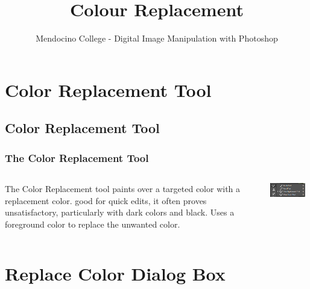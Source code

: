 \documentclass{beamer}
\title{Colour Replacement}
\author{Mendocino College - Digital Image Manipulation with Photoshop}
\date{\vspace{-5em}}
\begin{document}
	{
		\begin{frame}
			\vspace{-35pt}
			\maketitle
		\end{frame}
	}

		\section{Color Replacement Tool}
			\subsection{Color Replacement Tool}		
			\begin{frame}
				\frametitle{The Color Replacement Tool}
				\begin{columns}
					\column{.6\textwidth}
					\vspace{-25pt}
					\begin{outline}
						\1 The Color Replacement tool paints over a targeted color with a replacement color. 
						\1 good for quick edits, it often proves unsatisfactory, particularly with dark colors and black. 
						\1 Uses a foreground color to replace the unwanted color.
					\end{outline}
					\column{.45\textwidth}
					\includegraphics[width=0.9\textwidth]{images/color replacement tool.png}
				\end{columns}
			\end{frame}

		\section{Replace Color Dialog Box}
\end{document}
